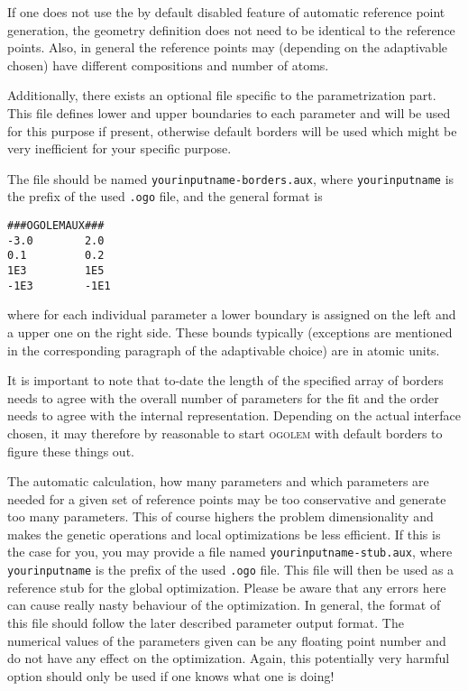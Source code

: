 \documentclass[a4paper,10pt]{scrbook}
\newcommand{\ogo}{\textsc{ogolem}}
\begin{document}
If one does not use the by default disabled feature of automatic reference point
generation, the geometry definition does not need to be identical to the
reference points. Also, in general the reference points may (depending on the
adaptivable chosen) have different compositions and number of atoms.

Additionally, there exists an optional file specific to the parametrization
part. This file defines lower and upper boundaries to each parameter and will be
used for this purpose if present, otherwise default borders will be used which
might be very inefficient for your specific purpose.

The file should be named \texttt{yourinputname-borders.aux}, where
\texttt{yourinputname} is the prefix of the used \texttt{.ogo} file, and the
general format is
\begin{verbatim}
###OGOLEMAUX###
-3.0        2.0
0.1         0.2
1E3         1E5
-1E3        -1E1
\end{verbatim}
where for each individual parameter a lower boundary is assigned on the left and
a upper one on the right side. These bounds typically (exceptions are mentioned
in the corresponding paragraph of the adaptivable choice) are in atomic units.


It is important to note that to-date the length of the specified array of
borders needs to agree with the overall number of parameters for the fit and the
order needs to agree with the internal representation. Depending on the actual
interface chosen, it may therefore by reasonable to start \ogo{} with default
borders to figure these things out.

The automatic calculation, how many parameters and which parameters are needed
for a given set of reference points may be too conservative and generate too
many parameters. This of course highers the problem dimensionality and makes the
genetic operations and local optimizations be less efficient. If this is the
case for you, you may provide a file named \texttt{yourinputname-stub.aux},
where \texttt{yourinputname} is the prefix of the used \texttt{.ogo} file. This
file will then be used as a reference stub for the global optimization. Please
be aware that any errors here can cause really nasty behaviour of the
optimization. In general, the format of this file should follow the later
described parameter output format. The numerical values of the parameters given
can be any floating point number and do not have any effect on the optimization.
Again, this potentially very harmful option should only be used if one knows
what one is doing!
\end{document}

